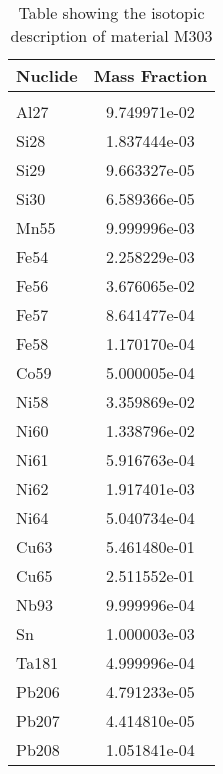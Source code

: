 \begin{centering}
\begin{table}[ht!]
\begin{tabular}{l | c}
\hline
Nuclide & Mass Fraction\\
\hline
\\
Al27 & 9.749971e-02\\
Si28 & 1.837444e-03\\
Si29 & 9.663327e-05\\
Si30 & 6.589366e-05\\
Mn55 & 9.999996e-03\\
Fe54 & 2.258229e-03\\
Fe56 & 3.676065e-02\\
Fe57 & 8.641477e-04\\
Fe58 & 1.170170e-04\\
Co59 & 5.000005e-04\\
Ni58 & 3.359869e-02\\
Ni60 & 1.338796e-02\\
Ni61 & 5.916763e-04\\
Ni62 & 1.917401e-03\\
Ni64 & 5.040734e-04\\
Cu63 & 5.461480e-01\\
Cu65 & 2.511552e-01\\
Nb93 & 9.999996e-04\\
Sn & 1.000003e-03\\
Ta181 & 4.999996e-04\\
Pb206 & 4.791233e-05\\
Pb207 & 4.414810e-05\\
Pb208 & 1.051841e-04
\end{tabular}
\caption{Table showing the isotopic description of material M303}
\label{table:material_M303}
\end{table}\clearpage


\end{centering}
